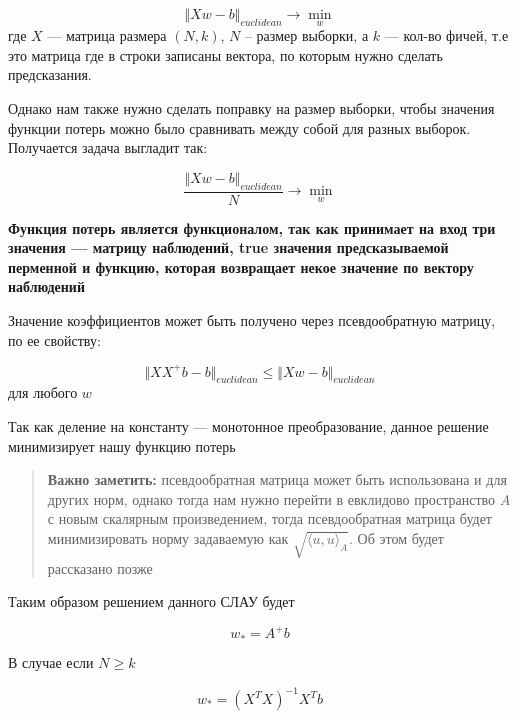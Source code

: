 \documentclass{article}
\begin{document}
    \begin{equation}
        \Vert Xw - b \Vert_{euclidean} \rightarrow \min_{w}
    \end{equation}
    где $X$ --- матрица размера $(N, k)$, $N$ -- размер выборки, а $k$ --- кол-во фичей, т.е это матрица где в строки записаны вектора,
    по которым нужно сделать предсказания.

    Однако нам также нужно сделать поправку на размер выборки, чтобы значения функции потерь можно было сравнивать между собой для разных выборок.
    Получается задача выгладит так:

     \begin{equation}
        \frac{\Vert Xw - b \Vert_{euclidean}}{N} \rightarrow \min_{w}
     \end{equation}
    
    \textbf{Функция потерь является функционалом, так как принимает на вход три значения --- матрицу наблюдений, true значения предсказываемой перменной и функцию, которая возвращает некое значение по вектору наблюдений}

    Значение коэффициентов может быть получено через псевдообратную матрицу, по ее свойству:

    \begin{equation}
        \Vert X X^{+} b - b \Vert_{euclidean} \leq \Vert X w - b \Vert_{euclidean}
    \end{equation}
    для любого $w$

    \quad

    Так как деление на константу --- монотонное преобразование, данное решение минимизирует нашу функцию потерь

    \begin{quote}
        \textbf{Важно заметить:} псевдообратная матрица может быть использована и для других норм, однако тогда нам
        нужно перейти в евклидово пространство $A$ с новым скалярным произведением, тогда псевдообратная матрица будет минимизировать
        норму задаваемую как $\sqrt{\langle u, u \rangle_{A}}$.
        Об этом будет рассказано позже
    \end{quote}

    Таким образом решением данного СЛАУ будет

    \begin{equation}
        w_{*} = A^{+}b
    \end{equation}

    В случае если $N \geq k$
    
    \begin{equation}
        w_{*} = (X^{T} X)^{-1} X^{T} b
    \end{equation}
\end{document}
